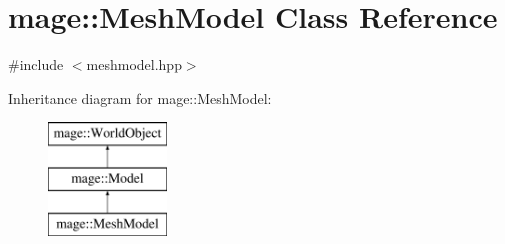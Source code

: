 \hypertarget{classmage_1_1_mesh_model}{}\section{mage\+:\+:Mesh\+Model Class Reference}
\label{classmage_1_1_mesh_model}


{\ttfamily \#include $<$meshmodel.\+hpp$>$}

Inheritance diagram for mage\+:\+:Mesh\+Model\+:\begin{figure}[H]
\begin{center}
\leavevmode
\includegraphics[height=3.000000cm]{classmage_1_1_mesh_model}
\end{center}
\end{figure}
